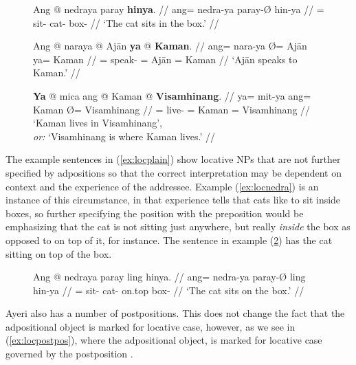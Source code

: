 \begin{figure}
\pex\label{ex:locplain}
\a\label{ex:locnedra}\begingl
	\gla Ang @ nedraya paray \textbf{hinya}. //
	\glb ang= nedra-ya paray-Ø hin-ya //
	\glc \AgtT{}= sit-\TsgM{} cat-\Top{} box-\Loc{} //
	\glft `The cat sits in the box.' //
\endgl

\a\label{ex:locnara}\begingl
	\gla Ang @ naraya {} @ Ajān \textbf{ya} @ \textbf{Kaman}. //
	\glb ang= nara-ya Ø= Ajān ya= Kaman //
	\glc \AgtT{}= speak-\TsgM{} \Top{}= Ajān \Loc{}= Kaman //
	\glft `Ajān speaks to Kaman.' //
\endgl

\a\label{ex:locmit}\begingl
	\gla \textbf{Ya} @ mica ang @ Kaman {} @ \textbf{Visamhinang}. //
	\glb ya= mit-ya ang= Kaman Ø= Visamhinang //
	\glc \LocT{}= live-\TsgM{} \Aarg{}= Kaman \Top{}= Visamhinang //
	\glft `Kaman lives in Visamhinang',\\
		\textit{or:} `Visamhinang is where Kaman lives.' //
\endgl
\xe
\end{figure}

The example sentences in (\ref{ex:locplain}) show locative NPs that are not
further specified by adpositions so that the correct interpretation may be
dependent on context and the experience of the addressee. Example
(\ref{ex:locnedra}) is an instance of this circumstance, in that experience
tells that cats like to sit inside boxes, so further specifying the position
with the preposition  would be emphasizing that the
cat is not sitting just anywhere, but really \emph{inside} the box as opposed
to on top of it, for instance. The sentence in example (\ref{ex:expladp}) has
the cat sitting on top of the box.

\begin{figure}[h]
\ex\label{ex:expladp}
\begingl
	\gla Ang @ nedraya paray ling hinya. //
	\glb ang= nedra-ya paray-Ø ling hin-ya //
	\glc \AgtT{}= sit-\TsgM{} cat-\Top{} on.top box-\Loc{} //
	\glft `The cat sits on the box.' //
\endgl\xe
\end{figure}

Ayeri also has a number of postpositions. This does not change the fact that
the adpositional object is marked for locative case, however, as we see in
(\ref{ex:locpostpos}), where the adpositional object,
 is marked for locative case governed by the
postposition .

